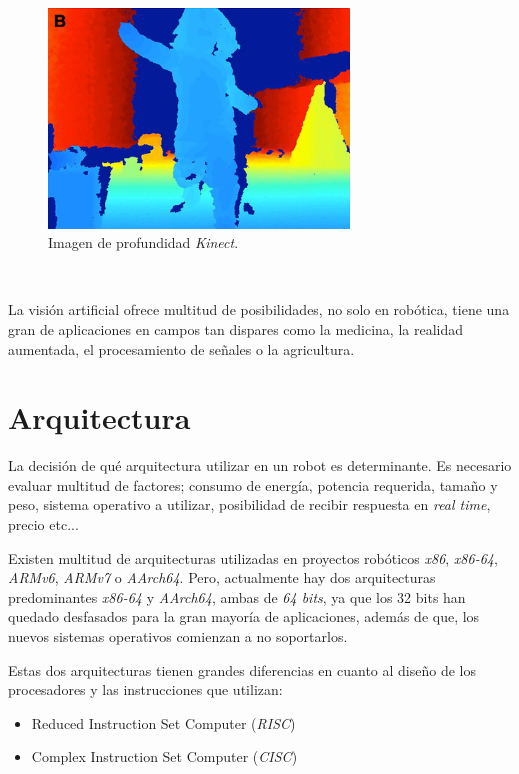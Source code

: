 \begin{figure} [h!]
	\begin{center}
		\includegraphics[width=8cm]{figs/depth}
	\end{center}
	\caption{Imagen de profundidad \textit{Kinect}.}
	\label{fig:depth}
\end{figure}\

La visión artificial ofrece multitud de posibilidades, no solo en robótica, tiene una gran de aplicaciones en campos tan dispares como la medicina, la realidad aumentada, el procesamiento de señales o la agricultura.\\

\section{Arquitectura}
\label{sec:arquitectura}
La decisión de qué arquitectura utilizar en un robot es determinante. Es necesario evaluar multitud de factores; consumo de energía, potencia requerida, tamaño y peso, sistema operativo a utilizar, posibilidad de recibir respuesta en \textit{real time}, precio etc...

Existen multitud de arquitecturas utilizadas en proyectos robóticos \textit{x86}, \textit{x86-64}, \textit{ARMv6}, \textit{ARMv7} o \textit{AArch64}. Pero, actualmente hay dos arquitecturas predominantes \textit{x86-64} y \textit{AArch64}, ambas de \textit{64 bits}, ya que los 32 bits han quedado desfasados para la gran mayoría de aplicaciones, además de que, los nuevos sistemas operativos comienzan a no soportarlos. \cite{canonical32bits}

Estas dos arquitecturas tienen grandes diferencias en cuanto al diseño de los procesadores y las instrucciones que utilizan:
\begin{itemize}
	\item Reduced Instruction Set Computer (\textit{RISC})
	\item Complex Instruction Set Computer (\textit{CISC})
\end{itemize}\

